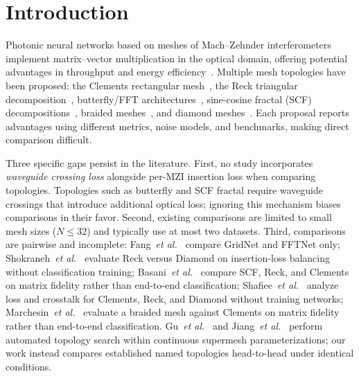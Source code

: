 \documentclass[11pt,a4paper]{article}
\begin{document}
\section{Introduction}
\label{sec:intro}

Photonic neural networks based on meshes of Mach--Zehnder interferometers implement
matrix--vector multiplication in the optical domain, offering potential advantages in
throughput and energy efficiency~\cite{shen2017,tsakyridis2024,bandyopadhyay2024}.
Multiple mesh topologies have been proposed: the Clements rectangular
mesh~\cite{clements2016}, the Reck triangular decomposition~\cite{reck1994},
butterfly/FFT architectures~\cite{tian2022,feng2022}, sine-cosine fractal (SCF)
decompositions~\cite{basani2023}, braided meshes~\cite{marchesin2025}, and
diamond meshes~\cite{shokraneh2020,mojaver2023}.
Each proposal reports advantages using different metrics, noise models, and benchmarks,
making direct comparison difficult.

Three specific gaps persist in the literature.  First, no study incorporates
\emph{waveguide crossing loss} alongside per-MZI insertion loss when comparing
topologies.  Topologies such as butterfly and SCF fractal require waveguide crossings
that introduce additional optical loss; ignoring this mechanism biases comparisons in
their favor.  Second, existing comparisons are limited to small mesh sizes ($N \leq 32$)
and typically use at most two datasets.  Third, comparisons are pairwise and
incomplete: Fang~\textit{et al.}~\cite{fang2019} compare GridNet and FFTNet only;
Shokraneh~\textit{et al.}~\cite{shokraneh2020} evaluate Reck versus Diamond on
insertion-loss balancing without classification training;
Basani~\textit{et al.}~\cite{basani2023} compare SCF, Reck, and Clements on matrix
fidelity rather than end-to-end classification;
Shafiee~\textit{et al.}~\cite{shafiee2024} analyze loss and crosstalk for Clements,
Reck, and Diamond without training networks;
Marchesin~\textit{et al.}~\cite{marchesin2025} evaluate a braided mesh against
Clements on matrix fidelity rather than end-to-end classification.
Gu~\textit{et al.}~\cite{gu2022} and Jiang~\textit{et al.}~\cite{jiang2025} perform
automated topology search within continuous supermesh parameterizations; our work
instead compares established named topologies head-to-head under identical conditions.
\end{document}
